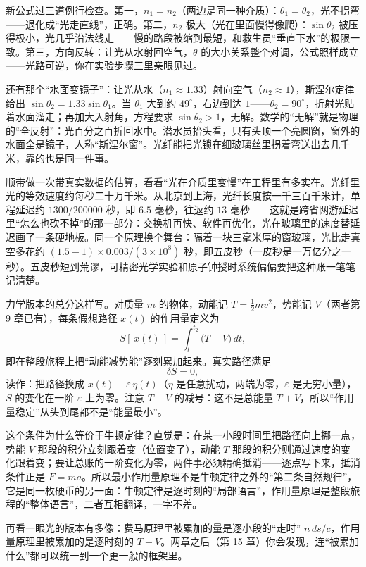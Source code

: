 \begin{mainline}
新公式过三道例行检查。第一，\(n_1=n_2\)（两边是同一种介质）：\(\theta_1=\theta_2\)，光不拐弯——退化成“光走直线”，正确。第二，\(n_2\) 极大（光在里面慢得像爬）：\(\sin\theta_2\) 被压得极小，光几乎沿法线走——慢的路段被缩到最短，和救生员“垂直下水”的极限一致。第三，方向反转：让光从水射回空气，\(\theta\) 的大小关系整个对调，公式照样成立——光路可逆，你在实验步骤三里亲眼见过。
\end{mainline}

还有那个“水面变镜子”：让光从水（\(n_1\approx1.33\)）射向空气（\(n_2\approx1\)），斯涅尔定律给出 \(\sin\theta_2=1.33\sin\theta_1\)。当 \(\theta_1\) 大到约 \(49^{\circ}\)，右边到达 \(1\)——\(\theta_2=90^{\circ}\)，折射光贴着水面溜走；再加大入射角，方程要求 \(\sin\theta_2>1\)，无解。数学的“无解”就是物理的“全反射”：光百分之百折回水中。潜水员抬头看，只有头顶一个亮圆窗，窗外的水面全是镜子，人称“斯涅尔窗”。光纤能把光锁在细玻璃丝里拐着弯送出去几千米，靠的也是同一件事。

顺带做一次带真实数据的估算，看看“光在介质里变慢”在工程里有多实在。光纤里光的等效速度约每秒二十万千米。从北京到上海，光纤长度按一千三百千米计，单程延迟约 \(1300/200000\) 秒，即 \(6.5\) 毫秒，往返约 \(13\) 毫秒——这就是跨省网游延迟里“怎么也砍不掉”的那一部分：交换机再快、软件再优化，光在玻璃里的速度替延迟画了一条硬地板。同一个原理换个舞台：隔着一块三毫米厚的窗玻璃，光比走真空多花约 \((1.5-1)\times 0.003/(3\times10^{8})\) 秒，即五皮秒（一皮秒是一万亿分之一秒）。五皮秒短到荒谬，可精密光学实验和原子钟授时系统偏偏要把这种账一笔笔记清楚。

\begin{mathbridge}
力学版本的总分这样写。对质量 \(m\) 的物体，动能记 \(T=\frac12 mv^2\)，势能记 \(V\)（两者第 9 章已有），每条假想路径 \(x(t)\) 的作用量定义为
\[
  S[\,x(t)\,]=\int_{t_1}^{t_2}\bigl(T-V\bigr)\,dt,
\]
即在整段旅程上把“动能减势能”逐刻累加起来。真实路径满足
\[
  \delta S=0,
\]
读作：把路径换成 \(x(t)+\varepsilon\,\eta(t)\)（\(\eta\) 是任意扰动，两端为零，\(\varepsilon\) 是无穷小量），\(S\) 的变化在一阶 \(\varepsilon\) 上为零。注意 \(T-V\) 的减号：这不是总能量 \(T+V\)，所以“作用量稳定”从头到尾都不是“能量最小”。

这个条件为什么等价于牛顿定律？直觉是：在某一小段时间里把路径向上挪一点，势能 \(V\) 那段的积分立刻跟着变（位置变了），动能 \(T\) 那段的积分则通过速度的变化跟着变；要让总账的一阶变化为零，两件事必须精确抵消——逐点写下来，抵消条件正是 \(F=ma\)。所以最小作用量原理不是牛顿定律之外的“第二条自然规律”，它是同一枚硬币的另一面：牛顿定律是逐时刻的“局部语言”，作用量原理是整段旅程的“整体语言”，二者互相翻译，一字不差。

再看一眼光的版本有多像：费马原理里被累加的量是逐小段的“走时” \(n\,ds/c\)，作用量原理里被累加的是逐时刻的 \(T-V\)。两章之后（第 15 章）你会发现，连“被累加什么”都可以统一到一个更一般的框架里。
\end{mathbridge}

